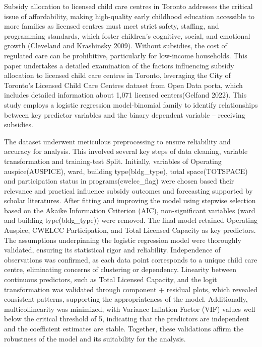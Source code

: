 \documentclass[
  letterpaper,
  DIV=11,
  numbers=noendperiod]{scrartcl}
\begin{document}
Subsidy allocation to licensed child care centres in Toronto addresses
the critical issue of affordability, making high-quality early childhood
education accessible to more families as licensed centres must meet
strict safety, staffing, and programming standards, which foster
children's cognitive, social, and emotional growth (Cleveland and
Krashinsky 2009). Without subsidies, the cost of regulated care can be
prohibitive, particularly for low-income households. This paper
undertakes a detailed examination of the factors influencing subsidy
allocation to licensed child care centres in Toronto, leveraging the
City of Toronto's Licensed Child Care Centres dataset from Open Data
porta, which includes detailed information about 1,071 licensed
centers(Gelfand 2022). This study employs a logistic regression
model-binomial family to identify relationships between key predictor
variables and the binary dependent variable -- receiving subsidies.

The dataset underwent meticulous preprocessing to ensure reliability and
accuracy for analysis. This involved several key steps of data cleaning,
variable transformation and training-test Split. Initially, variables of
Operating auspice(AUSPICE), ward, building type(bldg\_type), total
space(TOTSPACE) and participation status in programs(cwelcc\_flag) were
chosen based their relevance and practical influence subsidy outcomes
and forecasting supported by scholar literatures. After fitting and
improving the model using stepwise selection based on the Akaike
Information Criterion (AIC), non-significant variables (ward and
building type(bldg\_type)) were removed. The final model retained
Operating Auspice, CWELCC Participation, and Total Licensed Capacity as
key predictors. The assumptions underpinning the logistic regression
model were thoroughly validated, ensuring its statistical rigor and
reliability. Independence of observations was confirmed, as each data
point corresponds to a unique child care centre, eliminating concerns of
clustering or dependency. Linearity between continuous predictors, such
as Total Licensed Capacity, and the logit transformation was validated
through component + residual plots, which revealed consistent patterns,
supporting the appropriateness of the model. Additionally,
multicollinearity was minimized, with Variance Inflation Factor (VIF)
values well below the critical threshold of 5, indicating that the
predictors are independent and the coefficient estimates are stable.
Together, these validations affirm the robustness of the model and its
suitability for the analysis.
\end{document}
